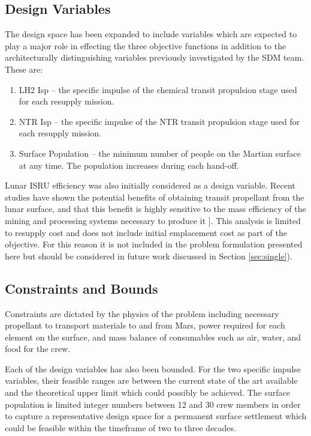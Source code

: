 \documentclass[]{aiaa-pretty}
\begin{document}
\subsection{Design Variables}
\label{sec:DVs}
The design space has been expanded to include variables which are expected to play a major role in effecting the three objective functions in addition to the architecturally distinguishing variables previously investigated by the SDM team. These are:
\begin{enumerate}
\item	LH2 Isp – the specific impulse of the chemical transit propulsion stage used for each resupply mission.
\item NTR Isp – the specific impulse of the NTR transit propulsion stage used for each resupply mission.
\item	Surface Population – the minimum number of people on the Martian surface at any time. The population increases during each hand-off.
\end{enumerate} 
Lunar ISRU efficiency was also initially considered as a design variable. Recent studies have shown the potential benefits of obtaining transit propellant from the lunar surface, and that this benefit is highly sensitive to the mass efficiency of the mining and processing systems necessary to produce it \cite{ho2014dynamic}]. This analysis is limited to resupply cost and does not include initial emplacement cost as part of the objective. For this reason it is not included in the problem formulation presented here but should be considered in future work discussed in Section \ref{sec:single}). 

\subsection{Constraints and Bounds}
\label{sec:constraints}
Constraints are dictated by the physics of the problem including necessary propellant to transport materials to and from Mars, power required for each element on the surface, and mass balance of consumables such as air, water, and food for the crew. 

Each of the design variables has also been bounded. For the two specific impulse variables, their feasible ranges are between the current state of the art available and the theoretical upper limit which could possibly be achieved. The surface population is limited integer numbers between 12 and 30 crew members in order to capture a representative design space for a permanent surface settlement which could be feasible within the timeframe of two to three decades.
\end{document}

